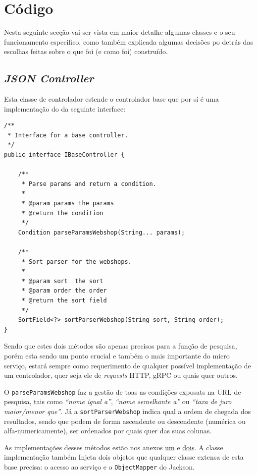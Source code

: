 \section{Código}

Nesta seguinte secção vai ser vista em maior detalhe algumas classes e o seu funcionamento especifico, como também explicada algumas decisões po detrás das escolhas feitas sobre o que foi (e como foi) construído.

\subsection{\textit{JSON Controller}}

Esta classe de controlador estende o controlador base que por sí é uma implementação do da seguinte interface:

\begin{lstlisting}[frame=bt,numbers=none]
/**
 * Interface for a base controller.
 */
public interface IBaseController {
    
    /**
     * Parse params and return a condition.
     *
     * @param params the params
     * @return the condition
     */
    Condition parseParamsWebshop(String... params);
    
    /**
     * Sort parser for the webshops.
     *
     * @param sort  the sort
     * @param order the order
     * @return the sort field
     */
    SortField<?> sortParserWebshop(String sort, String order);
}
\end{lstlisting}

Sendo que estes dois métodos são apenas precisos para a função de pesquisa, porém esta sendo um ponto crucial e também o mais importante do micro serviço, estará sempre como requerimento de qualquer possível implementação de um controlador, quer seja ele de \textit{requests} HTTP, gRPC ou quais quer outros.

O \texttt{parseParamsWebshop} faz a gestão de toas as condições exposats na URL de pesquisa, tais como \textit{``nome igual a''}, \textit{``nome semelhante a''} ou \textit{``taxa de juro maior/menor que''}. Já a \texttt{sortParserWebshop} indica qual a ordem de chegada dos resultados, sendo que podem de forma ascendente ou descendente (numérica ou alfa-numericamente), ser ordenados por quais quer das suas colunas.

As implementações desses métodos estão nos anexos \hyperref[an1]{um} e \hyperref[an2]{dois}. A classe implementação também Injeta dois objetos que qualquer classe extensa de esta base precisa: o acesso ao serviço e o \texttt{ObjectMapper} do Jackson.

